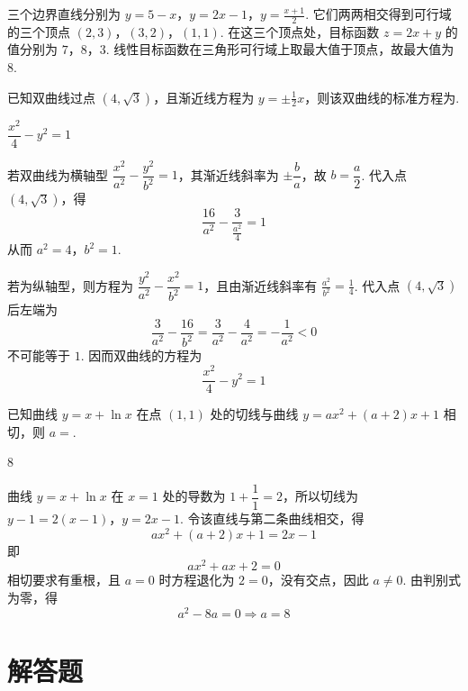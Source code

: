 \begin{solution}
三个边界直线分别为
\(y=5-x\)，\(y=2x-1\)，\(y=\frac{x+1}{2}\).
它们两两相交得到可行域的三个顶点
\((2,3)\)，\((3,2)\)，\((1,1)\).
在这三个顶点处，目标函数 \(z=2x+y\) 的值分别为 \(7\)，\(8\)，\(3\). 线性目标函数在三角形可行域上取最大值于顶点，故最大值为 \(8\).
\end{solution}

\begin{problem}
已知双曲线过点 \((4, \sqrt{3})\)，且渐近线方程为 \(y = \pm \frac{1}{2}x\)，则该双曲线的标准方程为\fillinblank{}.
\end{problem}

\begin{answer}
\(\dfrac{x^{2}}{4}-y^{2}=1\)
\end{answer}

\begin{solution}
若双曲线为横轴型 \(\dfrac{x^{2}}{a^{2}}-\dfrac{y^{2}}{b^{2}}=1\)，其渐近线斜率为 \(\pm\dfrac{b}{a}\)，故 \(b=\dfrac{a}{2}\). 代入点 \((4,\sqrt{3})\)，得
\[
\frac{16}{a^{2}}-\frac{3}{\frac{a^{2}}{4}}=1
\]
从而 \(a^{2}=4\)，\(b^{2}=1\).

若为纵轴型，则方程为 \(\dfrac{y^{2}}{a^{2}}-\dfrac{x^{2}}{b^{2}}=1\)，且由渐近线斜率有 \(\frac{a^{2}}{b^{2}}=\frac{1}{4}\). 代入点 \((4,\sqrt{3})\) 后左端为
\[
\frac{3}{a^{2}}-\frac{16}{b^{2}}=\frac{3}{a^{2}}-\frac{4}{a^{2}}=-\frac{1}{a^{2}}<0
\]
不可能等于 \(1\). 因而双曲线的方程为
\[
\frac{x^{2}}{4}-y^{2}=1
\]
\end{solution}

\begin{problem}
已知曲线 \( y = x + \ln x \) 在点 \((1, 1)\) 处的切线与曲线 \( y = ax^2 + (a + 2)x + 1 \) 相切，则 \(a =\)\fillinblank{}.
\end{problem}

\begin{answer}
8
\end{answer}

\begin{solution}
曲线 \(y=x+\ln x\) 在 \(x=1\) 处的导数为 \(1+\dfrac11=2\)，所以切线为
\(y-1=2(x-1)\)，\(y=2x-1\).
令该直线与第二条曲线相交，得
\[
ax^{2}+(a+2)x+1=2x-1
\]
即
\[
ax^{2}+ax+2=0
\]
相切要求有重根，且 \(a=0\) 时方程退化为 \(2=0\)，没有交点，因此 \(a\ne0\). 由判别式为零，得
\[
a^{2}-8a=0\Longrightarrow a=8
\]
\end{solution}

\section{解答题}

